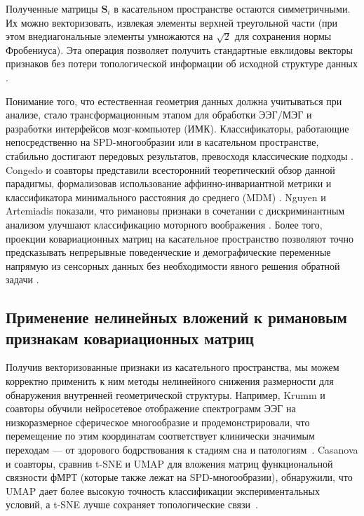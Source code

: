 Полученные матрицы $\mathbf{S}_i$ в касательном пространстве остаются симметричными. Их можно векторизовать, извлекая элементы верхней треугольной части (при этом внедиагональные элементы умножаются на $\sqrt{2}$ для сохранения нормы Фробениуса). Эта операция позволяет получить стандартные евклидовы векторы признаков без потери топологической информации об исходной структуре данных \cite{xu2020tangent}.

Понимание того, что естественная геометрия данных должна учитываться при анализе, стало трансформационным этапом для обработки ЭЭГ/МЭГ и разработки интерфейсов мозг-компьютер (ИМК). Классификаторы, работающие непосредственно на SPD-многообразии или в касательном пространстве, стабильно достигают передовых результатов, превосходя классические подходы \cite{Barachant2012, Barachant2013}. Congedo и соавторы представили всесторонний теоретический обзор данной парадигмы, формализовав использование аффинно-инвариантной метрики и классификатора минимального расстояния до среднего (MDM) \cite{Congedo2017}. Nguyen и Artemiadis показали, что римановы признаки в сочетании с дискриминантным анализом улучшают классификацию моторного воображения \cite{Nguyen2018}. Более того, проекции ковариационных матриц на касательное пространство позволяют точно предсказывать непрерывные поведенческие и демографические переменные напрямую из сенсорных данных без необходимости явного решения обратной задачи \cite{Sabbagh2019, Sabbagh2020}.

\subsection{Применение нелинейных вложений к римановым признакам ковариационных матриц}
\label{sec:nonlinear_riemannian}

Получив векторизованные признаки из касательного пространства, мы можем корректно применить к ним методы нелинейного снижения размерности для обнаружения внутренней геометрической структуры. Например, Krumm и соавторы обучили нейросетевое отображение спектрограмм ЭЭГ на низкоразмерное сферическое многообразие и продемонстрировали, что перемещение по этим координатам соответствует клинически значимым переходам --- от здорового бодрствования к стадиям сна и патологиям~\cite{Krumm2024}. Casanova и соавторы, сравнив t-SNE и UMAP для вложения матриц функциональной связности фМРТ (которые также лежат на SPD-многообразии), обнаружили, что UMAP дает более высокую точность классификации экспериментальных условий, а t-SNE лучше сохраняет топологические связи~\cite{Casanova2021}.

